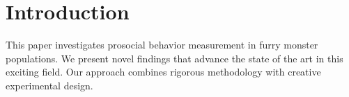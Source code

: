 \section{Introduction}

This paper investigates prosocial behavior measurement in furry monster populations. We present novel findings that advance the state of the art in this exciting field. Our approach combines rigorous methodology with creative experimental design.
